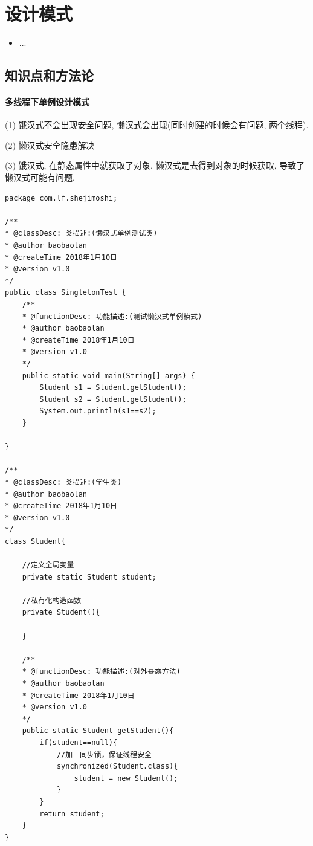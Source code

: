 \chapter{设计模式}
\label{chap1}
\begin{itemize}[noitemsep,topsep=0pt,parsep=0pt,partopsep=0pt]
	\item ...
\end{itemize}

\section{知识点和方法论}
\subsubsection{多线程下单例设计模式}
(1) 饿汉式不会出现安全问题, 懒汉式会出现(同时创建的时候会有问题, 两个线程). \par
(2) 懒汉式安全隐患解决 \par
(3) 饿汉式, 在静态属性中就获取了对象, 懒汉式是去得到对象的时候获取, 导致了懒汉式可能有问题.
\begin{lstlisting}
package com.lf.shejimoshi;

/**
* @classDesc: 类描述:(懒汉式单例测试类) 
* @author baobaolan
* @createTime 2018年1月10日  
* @version v1.0
*/
public class SingletonTest {
	/**
	* @functionDesc: 功能描述:(测试懒汉式单例模式) 
	* @author baobaolan
	* @createTime 2018年1月10日  
	* @version v1.0
	*/
	public static void main(String[] args) {
		Student s1 = Student.getStudent();
		Student s2 = Student.getStudent();
		System.out.println(s1==s2);
	}    
	
}

/**
* @classDesc: 类描述:(学生类) 
* @author baobaolan
* @createTime 2018年1月10日  
* @version v1.0
*/
class Student{
	
	//定义全局变量
	private static Student student;
	
	//私有化构造函数
	private Student(){
		
	}
	
	/**
	* @functionDesc: 功能描述:(对外暴露方法) 
	* @author baobaolan
	* @createTime 2018年1月10日  
	* @version v1.0
	*/
	public static Student getStudent(){
		if(student==null){
			//加上同步锁，保证线程安全
			synchronized(Student.class){
				student = new Student();
			}
		}
		return student;
	}
}
\end{lstlisting}

